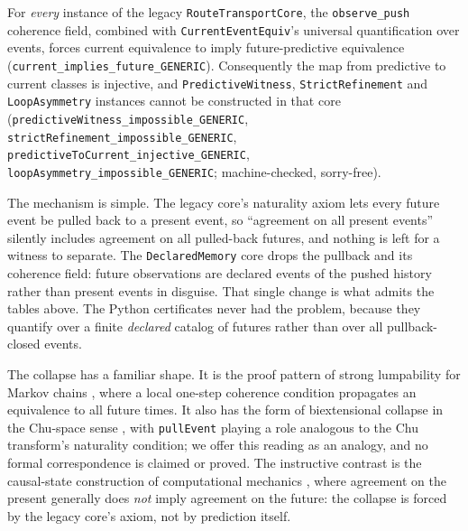 For \emph{every} instance of the legacy \texttt{RouteTransportCore}, the \texttt{observe\_push}
coherence field, combined with \texttt{CurrentEventEquiv}'s universal quantification over events,
forces current equivalence to imply future-predictive equivalence
(\texttt{current\_\allowbreak{}implies\_\allowbreak{}future\_\allowbreak{}GENERIC}). Consequently the map from predictive to current
classes is injective, and \texttt{PredictiveWitness}, \texttt{StrictRefinement} and
\texttt{LoopAsymmetry} instances cannot be constructed in that core
(\texttt{predictiveWitness\_\allowbreak{}impossible\_\allowbreak{}GENERIC}, \texttt{strictRefinement\_\allowbreak{}impossible\_\allowbreak{}GENERIC},
\texttt{predictiveToCurrent\_\allowbreak{}injective\_\allowbreak{}GENERIC}, \texttt{loopAsymmetry\_\allowbreak{}impossible\_\allowbreak{}GENERIC};
machine-checked, sorry-free).

The mechanism is simple. The legacy core's naturality axiom lets every future event be pulled back
to a present event, so ``agreement on all present events'' silently includes agreement on all
pulled-back futures, and nothing is left for a witness to separate. The \texttt{DeclaredMemory}
core drops the pullback and its coherence field: future observations are declared events of the
pushed history rather than present events in disguise. That single change is what admits the
tables above. The Python certificates never had the problem, because they quantify over a finite
\emph{declared} catalog of futures rather than over all pullback-closed events.

The collapse has a familiar shape. It is the proof pattern of strong lumpability for Markov chains
\cite{kemeny-snell-1960,buchholz-1994}, where a local one-step coherence condition propagates an
equivalence to all future times. It also has the form of biextensional collapse in the Chu-space
sense \cite{barr-1979,pratt-1999,parente-2024}, with \texttt{pullEvent} playing a role analogous to
the Chu transform's naturality condition; we offer this reading as an analogy, and no formal
correspondence is claimed or proved. The instructive contrast is the causal-state construction of
computational mechanics \cite{shalizi-crutchfield-2001}, where agreement on the present generally
does \emph{not} imply agreement on the future: the collapse is forced by the legacy core's axiom,
not by prediction itself.
